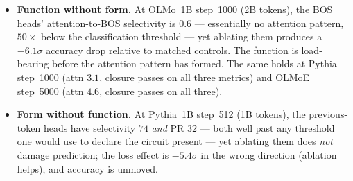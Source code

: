 \documentclass[11pt]{article}
\begin{document}
\begin{itemize}
\item \textbf{Function without form.} At OLMo~1B step~1000 (2B tokens),
  the BOS heads' attention-to-BOS selectivity is $0.6$ --- essentially
  no attention pattern, $50\times$ below the classification threshold ---
  yet ablating them produces a $-6.1\sigma$ accuracy drop relative to
  matched controls. The function is load-bearing before the attention
  pattern has formed. The same holds at Pythia step~1000 (attn $3.1$,
  closure passes on all three metrics) and OLMoE step~5000 (attn $4.6$,
  closure passes on all three).
\item \textbf{Form without function.} At Pythia~1B step~512 (1B tokens),
  the previous-token heads have selectivity $74$ \emph{and} PR $32$ ---
  both well past any threshold one would use to declare the circuit
  present --- yet ablating them does \emph{not} damage prediction; the
  loss effect is $-5.4\sigma$ in the wrong direction (ablation helps),
  and accuracy is unmoved.
\end{itemize}
\end{document}
